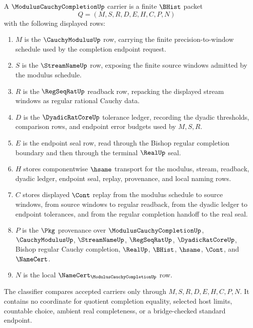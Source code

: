 \begin{definition}
\label{def:modulus-cauchy-completion-carrier}
A $\ModulusCauchyCompletionUp$ carrier is a finite $\BHist$ packet
$$
Q=(M,S,R,D,E,H,C,P,N)
$$
with the following displayed rows:
\begin{enumerate}
\item $M$ is the $\CauchyModulusUp$ row, carrying the finite precision-to-window schedule used by the completion endpoint request.
\item $S$ is the $\StreamNameUp$ row, exposing the finite source windows admitted by the modulus schedule.
\item $R$ is the $\RegSeqRatUp$ readback row, repacking the displayed stream windows as regular rational Cauchy data.
\item $D$ is the $\DyadicRatCoreUp$ tolerance ledger, recording the dyadic thresholds, comparison rows, and endpoint error budgets used by $M,S,R$.
\item $E$ is the endpoint seal row, read through the Bishop regular completion boundary and then through the terminal $\RealUp$ seal.
\item $H$ stores componentwise $\hsame$ transport for the modulus, stream, readback, dyadic ledger, endpoint seal, replay, provenance, and local naming rows.
\item $C$ stores displayed $\Cont$ replay from the modulus schedule to source windows, from source windows to regular readback, from the dyadic ledger to endpoint tolerances, and from the regular completion handoff to the real seal.
\item $P$ is the $\Pkg$ provenance over $\ModulusCauchyCompletionUp$, $\CauchyModulusUp$, $\StreamNameUp$, $\RegSeqRatUp$, $\DyadicRatCoreUp$, Bishop regular Cauchy completion, $\RealUp$, $\BHist$, $\hsame$, $\Cont$, and $\NameCert$.
\item $N$ is the local $\NameCert_{\ModulusCauchyCompletionUp}$ row.
\end{enumerate}
The classifier compares accepted carriers only through $M,S,R,D,E,H,C,P,N$. It contains no coordinate for quotient completion equality, selected host limits, countable choice, ambient real completeness, or a bridge-checked standard endpoint.
\end{definition}

